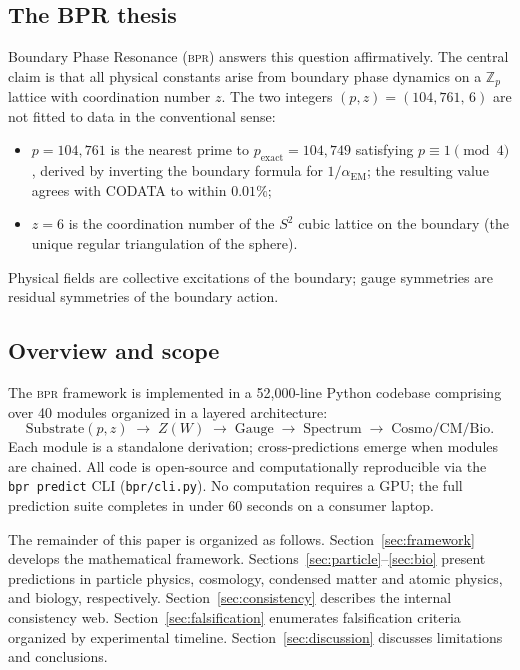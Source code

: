 \documentclass[aps,prd,twocolumn,superscriptaddress,longbibliography,nofootinbib]{revtex4-2}
\newcommand{\Zp}{\mathbb{Z}_p}
\newcommand{\Stwo}{S^2}
\newcommand{\alphaEM}{\alpha_{\mathrm{EM}}}
\newcommand{\Zimp}{Z}
\newcommand{\bpr}{\textsc{bpr}}
\begin{document}
\subsection{The BPR thesis}

Boundary Phase Resonance (\bpr) answers this question affirmatively.
The central claim is that all physical constants arise from boundary
phase dynamics on a $\Zp$ lattice with coordination number $z$.
The two integers $(p, z) = (104{,}761,\, 6)$ are not fitted to
data in the conventional sense:
\begin{itemize}
\item $p = 104{,}761$ is the nearest prime to
  $p_\text{exact}=104{,}749$ satisfying $p\equiv 1\pmod{4}$, derived
  by inverting the boundary formula for $1/\alphaEM$; the resulting
  value agrees with CODATA to within $0.01\%$;
\item $z = 6$ is the coordination number of the $\Stwo$ cubic
  lattice on the boundary (the unique regular triangulation of the
  sphere).
\end{itemize}
Physical fields are collective excitations of the boundary; gauge
symmetries are residual symmetries of the boundary action.

\subsection{Overview and scope}

The \bpr{} framework is implemented in a 52{,}000-line Python
codebase comprising over 40 modules organized in a layered
architecture:
\begin{equation}
\text{Substrate}(p,z) \;\to\; \Zimp(W) \;\to\;
\text{Gauge} \;\to\; \text{Spectrum} \;\to\;
\text{Cosmo/CM/Bio}.
\label{eq:architecture}
\end{equation}
Each module is a standalone derivation; cross-predictions emerge
when modules are chained.  All code is open-source and
computationally reproducible via the \texttt{bpr predict} CLI
(\texttt{bpr/cli.py}).  No computation requires a GPU; the full
prediction suite completes in under 60 seconds on a consumer
laptop.

The remainder of this paper is organized as follows.
Section~\ref{sec:framework} develops the mathematical framework.
Sections~\ref{sec:particle}--\ref{sec:bio} present predictions in
particle physics, cosmology, condensed matter and atomic physics,
and biology, respectively.  Section~\ref{sec:consistency} describes
the internal consistency web.  Section~\ref{sec:falsification}
enumerates falsification criteria organized by experimental
timeline.  Section~\ref{sec:discussion} discusses limitations and
conclusions.
\end{document}
